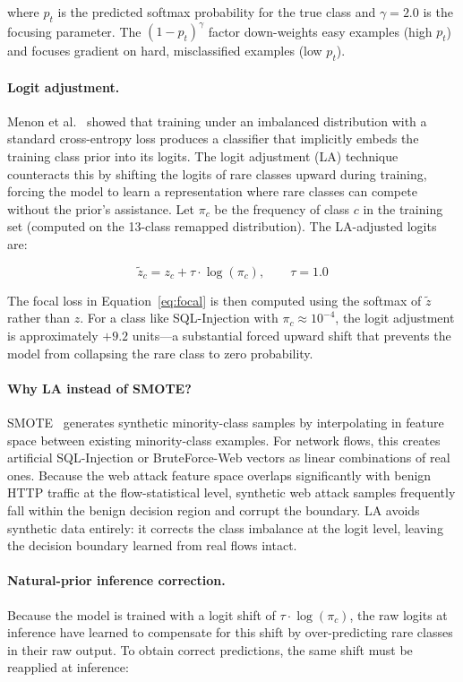 \documentclass[12pt]{article}
\theoremstyle{plain}
\begin{document}
where $p_t$ is the predicted softmax probability for the true class and $\gamma = 2.0$ is the focusing parameter. The $(1 - p_t)^{\gamma}$ factor down-weights easy examples (high $p_t$) and focuses gradient on hard, misclassified examples (low $p_t$).

\paragraph{Logit adjustment.} Menon et al.~\cite{Menon2021} showed that training under an imbalanced distribution with a standard cross-entropy loss produces a classifier that implicitly embeds the training class prior into its logits. The logit adjustment (LA) technique counteracts this by shifting the logits of rare classes upward during training, forcing the model to learn a representation where rare classes can compete without the prior's assistance. Let $\pi_c$ be the frequency of class $c$ in the training set (computed on the 13-class remapped distribution). The LA-adjusted logits are:

\begin{equation}
\tilde{z}_c = z_c + \tau \cdot \log(\pi_c), \qquad \tau = 1.0
\label{eq:la}
\end{equation}

The focal loss in Equation~\ref{eq:focal} is then computed using the softmax of $\tilde{z}$ rather than $z$. For a class like SQL-Injection with $\pi_c \approx 10^{-4}$, the logit adjustment is approximately $+9.2$ units—a substantial forced upward shift that prevents the model from collapsing the rare class to zero probability.

\paragraph{Why LA instead of SMOTE?} SMOTE~\cite{Chawla2002} generates synthetic minority-class samples by interpolating in feature space between existing minority-class examples. For network flows, this creates artificial SQL-Injection or BruteForce-Web vectors as linear combinations of real ones. Because the web attack feature space overlaps significantly with benign HTTP traffic at the flow-statistical level, synthetic web attack samples frequently fall within the benign decision region and corrupt the boundary. LA avoids synthetic data entirely: it corrects the class imbalance at the logit level, leaving the decision boundary learned from real flows intact.

\paragraph{Natural-prior inference correction.} Because the model is trained with a logit shift of $\tau \cdot \log(\pi_c)$, the raw logits at inference have learned to compensate for this shift by over-predicting rare classes in their raw output. To obtain correct predictions, the same shift must be reapplied at inference:
\end{document}
